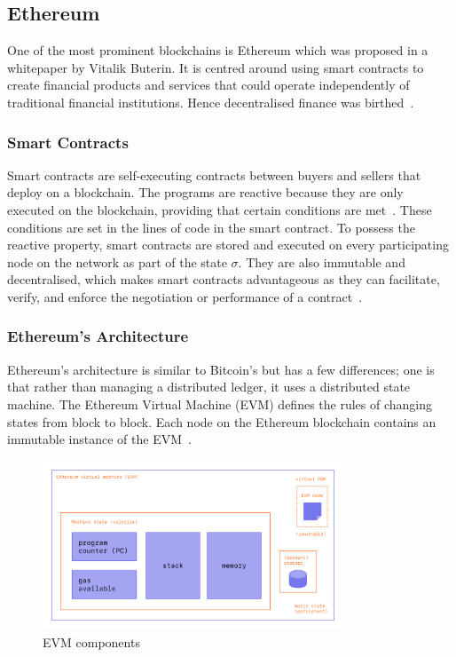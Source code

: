 \subsection{Ethereum}
One of the most prominent blockchains is Ethereum which was proposed in a whitepaper by Vitalik Buterin. It is centred around using smart contracts to create financial products and services that could operate independently of traditional financial institutions. Hence decentralised finance was birthed~\cite{buterin2014next}.

\subsubsection{Smart Contracts}
Smart contracts are self-executing contracts between buyers and sellers that deploy on a blockchain. The programs are reactive because they are only executed on the blockchain, providing that certain conditions are met~\cite{noauthor_what_nodate}. These conditions are set in the lines of code in the smart contract. To possess the reactive property, smart contracts are stored and executed on every participating node on the network as part of the state $\sigma$. They are also immutable and decentralised, which makes smart contracts advantageous as they can facilitate, verify, and enforce the negotiation or performance of a contract~\cite{noauthor_introduction_nodate, noauthor_smart_nodate}.

\subsubsection{Ethereum's Architecture}
Ethereum's architecture is similar to Bitcoin's but has a few differences; one is that rather than managing a distributed ledger, it uses a distributed state machine. The Ethereum Virtual Machine (EVM) defines the rules of changing states from block to block. Each node on the Ethereum blockchain contains an immutable instance of the EVM~\cite{noauthor_ethereum_nodate}.

\begin{figure}[!htb]
    \centering
    \includegraphics[width=0.8\textwidth]{background/Images/evm.png}
    \caption{EVM components~\cite{noauthor_ethereum_nodate}}
\end{figure}

